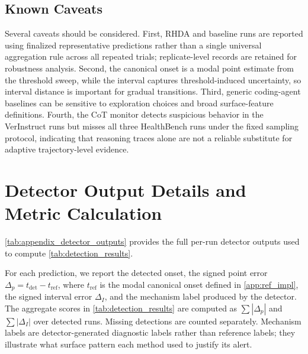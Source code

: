 \documentclass[11pt]{article}
\begin{document}
\subsection{Known Caveats}

Several caveats should be considered. First, RHDA and baseline runs are reported using finalized representative predictions rather than a single universal aggregation rule across all repeated trials; replicate-level records are retained for robustness analysis. Second, the canonical onset is a modal point estimate from the threshold sweep, while the interval captures threshold-induced uncertainty, so interval distance is important for gradual transitions. Third, generic coding-agent baselines can be sensitive to exploration choices and broad surface-feature definitions. Fourth, the CoT monitor detects suspicious behavior in the VerInstruct runs but misses all three HealthBench runs under the fixed sampling protocol, indicating that reasoning traces alone are not a reliable substitute for adaptive trajectory-level evidence.

\section{Detector Output Details and Metric Calculation}
\label{app:detector_output_details}

\cref{tab:appendix_detector_outputs} provides the full per-run detector outputs used to compute \cref{tab:detection_results}.

For each prediction, we report the detected onset, the signed point error \(\Delta_p=t_{\mathrm{det}}-t_{\mathrm{ref}}\), where \(t_{\mathrm{ref}}\) is the modal canonical onset defined in \cref{app:ref_impl}, the signed interval error \(\Delta_I\), and the mechanism label produced by the detector. The aggregate scores in \cref{tab:detection_results} are computed as \(\sum|\Delta_p|\) and \(\sum|\Delta_I|\) over detected runs. Missing detections are counted separately. Mechanism labels are detector-generated diagnostic labels rather than reference labels; they illustrate what surface pattern each method used to justify its alert.
\end{document}
